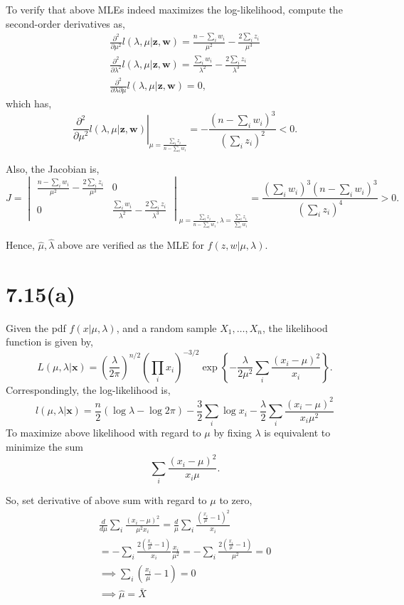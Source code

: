 \documentclass[letterpaper]{article}
\newcommand{\bx}{\mathbf{x}}
\begin{document}
    To verify that above MLEs indeed maximizes the log-likelihood, compute the second-order derivatives as,
    \begin{eqnarray*}
        \frac{\partial^2 }{\partial \mu^2} l(\lambda, \mu|\mathbf{z, w}) = \frac{n-\sum_i w_i}{\mu^2} - \frac{2 \sum_i z_i}{\mu^3} \\ 
        \frac{\partial^2 }{\partial \lambda^2} l(\lambda, \mu|\mathbf{z, w}) = \frac{\sum_i w_i}{\lambda^2} - \frac{2\sum_i z_i}{\lambda^3} \\
        \frac{\partial^2 }{\partial \lambda \partial \mu} l(\lambda, \mu|\mathbf{z, w}) = 0,
    \end{eqnarray*}
    which has,
    \[
    \left. \frac{\partial^2 }{\partial \mu^2} l(\lambda, \mu|\mathbf{z, w}) \right|_{\mu = \frac{\sum_i z_i}{n-\sum_i w_i}} = -\frac{(n-\sum_i w_i)^3}{(\sum_i z_i)^2} < 0.
    \]

    Also, the Jacobian is,
    \[
    J = \begin{vmatrix}
\frac{n-\sum_i w_i}{\mu^2} - \frac{2 \sum_i z_i}{\mu^3} & 0 \\
0 & \frac{\sum_i w_i}{\lambda^2} - \frac{2\sum_i z_i}{\lambda^3}  
    \end{vmatrix}_{\mu = \frac{\sum_i z_i}{n-\sum_i w_i}, \lambda=\frac{\sum_i z_i}{\sum_i w_i}} = \frac{(\sum_i w_i)^3 (n-\sum_i w_i)^3}{(\sum_i z_i)^4} > 0.
    \]

    Hence, $\hat \mu, \hat \lambda$ above are verified as the MLE for $f(z, w|\mu, \lambda)$.

    \section*{7.15(a)}
    Given the pdf $f(x|\mu, \lambda)$, and a random sample $X_1, \dotsc, X_n$, the likelihood function is given by,
    \[
    L(\mu, \lambda|\bx) = \left(\frac{\lambda}{2\pi}\right)^{n/2} \left(\prod_{i} x_i\right)^{-3/2} \exp \left\{-\frac{\lambda}{2\mu^2} \sum_i \frac{(x_i - \mu)^2}{x_i}\right\}.
    \]
    Correspondingly, the log-likelihood is,
    \[
    l(\mu, \lambda|\bx) = \frac{n}{2} (\log \lambda - \log 2\pi) -\frac{3}{2} \sum_i \log x_i - \frac{\lambda}{2} \sum_i \frac{(x_i - \mu)^2}{x_i \mu^2}
    \]
    To maximize above likelihood with regard to $\mu$ by fixing $\lambda$ is equivalent to minimize the sum
    \[
    \sum_i \frac{(x_i - \mu)^2}{x_i \mu}.
    \]

    So, set derivative of above sum with regard to $\mu$ to zero,
    \begin{eqnarray*}
    \frac{d}{d\mu} \sum_i \frac{(x_i - \mu)^2}{\mu^2 x_i} = \frac{d}{\mu} \sum_i \frac{(\frac{x_i}{\mu} - 1)^2}{x_i} \\
    = - \sum_i \frac{2(\frac{x_i}{\mu} - 1)}{x_i} \frac{x_i}{\mu^2} = - \sum_i \frac{2(\frac{x_i}{\mu} - 1)}{\mu^2} = 0 \\
    \implies \sum_i (\frac{x_i}{\mu} - 1) = 0 \\
    \implies \hat \mu = \bar X
    \end{eqnarray*}
\end{document}
